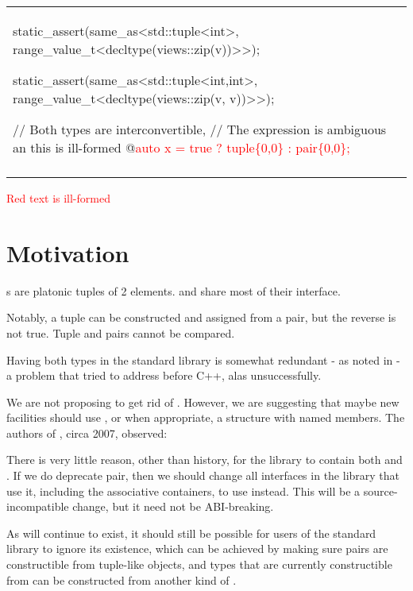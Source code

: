 \documentclass{wg21}
\begin{document}
\begin{center}
\begin{tabular}{l|l}
\begin{minipage}[t]{0.5\textwidth}
\begin{colorblock}
static_assert(same_as<std::tuple<int>,
    range_value_t<decltype(views::zip(v))>>);

static_assert(same_as<std::tuple<int,int>,
    range_value_t<decltype(views::zip(v, v))>>);
    
    
    
    
// Both types are interconvertible,
// The expression is ambiguous an this is ill-formed
@\textcolor{red}{auto x = true ?  tuple\{0,0\} : pair\{0,0\};} 

\end{colorblock}
\end{minipage}
\\\\ \hline

\end{tabular}
\end{center}

\textcolor{red}{Red text is ill-formed}

\section{Motivation}

s are platonic tuples of 2 elements.  and  share
most of their interface.

Notably, a tuple can be constructed and assigned from a pair, but the reverse is not true.
Tuple and pairs cannot be compared.

Having both types in the standard library is somewhat redundant - as noted in  - a problem that 
tried to address before C++, alas unsuccessfully.

We are not proposing to get rid of .
However, we are suggesting that maybe new facilities should use , or when appropriate, a structure with named members.
The authors of , circa 2007, observed:

\begin{quoteblock}
There is very little reason, other than history, for the library to contain both  and . If we do deprecate pair, then we should change all interfaces in the library that use it, including the associative containers, to use  instead. This will be a source-incompatible change, but it need not be ABI-breaking.
\end{quoteblock}

As  will continue to exist, it should still be possible for users of the standard library to ignore its existence, which can be achieved by making sure pairs are constructible from tuple-like objects, and types that are currently constructible from  can be constructed from another kind of .
\end{document}
